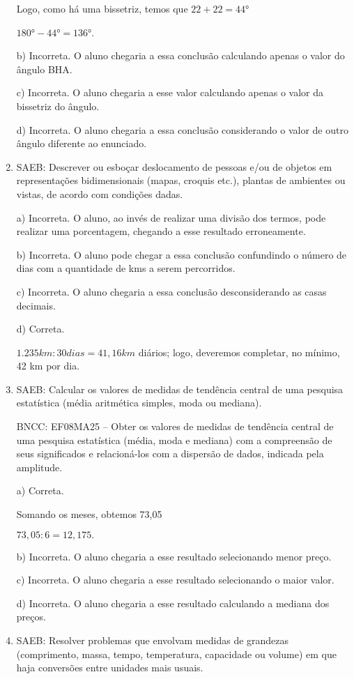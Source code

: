\begin{enumerate}
Logo, como há uma bissetriz, temos que $22 + 22= 44°$

$180°- 44°= 136°$.

b) Incorreta. O aluno chegaria a essa conclusão calculando apenas o
valor do ângulo BHA.

c) Incorreta. O aluno chegaria a esse valor calculando apenas o
valor da bissetriz do ângulo.

d) Incorreta. O aluno chegaria a essa conclusão considerando o
valor de outro ângulo diferente ao enunciado.

\item SAEB: Descrever ou esboçar deslocamento de pessoas e/ou de objetos em
representações bidimensionais (mapas, croquis etc.), plantas de
ambientes ou vistas, de acordo com condições dadas.

a) Incorreta. O aluno, ao invés de realizar uma divisão dos termos, pode
realizar uma porcentagem, chegando a esse resultado erroneamente.

b) Incorreta. O aluno pode chegar a essa conclusão confundindo o
número de dias com a quantidade de kms a serem percorridos.

c) Incorreta. O aluno chegaria a essa conclusão desconsiderando as
casas decimais.

d) Correta. 

$1.235km : 30 dias = 41,16 km$ diários; logo, deveremos completar, no
mínimo, 42 km por dia.

\item SAEB: Calcular os valores de medidas de tendência central de uma
pesquisa estatística (média aritmética simples, moda ou mediana).

BNCC: EF08MA25 -- Obter os valores de medidas de tendência central de
uma pesquisa estatística (média, moda e mediana) com a compreensão de
seus significados e relacioná-los com a dispersão de dados, indicada
pela amplitude.

a) Correta. 

Somando os meses, obtemos 73,05

$73,05 : 6 = 12,175.$

b) Incorreta. O aluno chegaria a esse resultado selecionando menor
preço.

c) Incorreta. O aluno chegaria a esse resultado selecionando o
maior valor.

d) Incorreta. O aluno chegaria a esse resultado calculando a
mediana dos preços.

\item SAEB: Resolver problemas que envolvam medidas de grandezas (comprimento,
massa, tempo, temperatura, capacidade ou volume) em que haja conversões
entre unidades mais usuais.


\end{enumerate}
